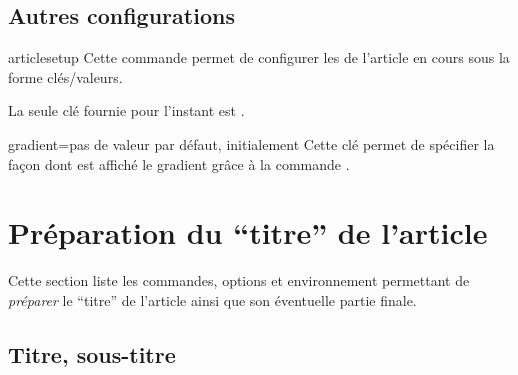 \documentclass[french,nolocaltoc]{nwejmart}
\newtheorem[title=Fait,style=definition]{fact}
\begin{document}
\subsection{Autres configurations}
\label{sec:autr-conf}

\begin{docCommand}{articlesetup}{}
  Cette commande permet de configurer les  de l'article en cours
  sous la forme clés/valeurs.

  La seule clé fournie pour l'instant est .
  \begin{docKey}{gradient}{=\textbar{}}{pas
      de valeur par défaut, initialement }
    Cette clé permet de spécifier la façon dont est affiché le gradient grâce
    à la commande .
  \end{docKey}
\end{docCommand}


\section{Préparation du \enquote{titre} de l'article}
\label{sec-prep-de-lart}

Cette section liste les commandes, options et environnement permettant de
\emph{préparer} le \enquote{titre} de l'article ainsi que son éventuelle partie
finale.

\subsection{Titre, sous-titre}
\label{sec-titre}
\end{document}

